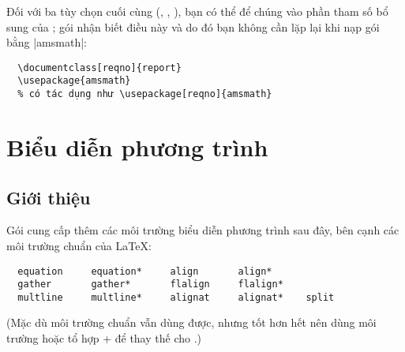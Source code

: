 \medskip
Đối với ba tùy chọn cuối cùng (, , ),
bạn có thể để chúng vào phần tham số bổ sung của ;
gói  nhận biết điều này và do đó bạn không cần lặp lại
khi nạp gói bằng |{amsmath}|:

\medskip
\begin{verbatim}
  \documentclass[reqno]{report}
  \usepackage{amsmath}
  % có tác dụng như \usepackage[reqno]{amsmath}
\end{verbatim}

\chapter{Biểu diễn phương trình}

\section{Giới thiệu}
Gói  cung cấp thêm các môi trường biểu diễn phương trình sau
đây, bên cạnh các môi trường chuẩn của \LaTeX{}:
\begin{verbatim}
  equation     equation*     align       align*
  gather       gather*       flalign     flalign*
  multline     multline*     alignat     alignat*    split
\end{verbatim}
(Mặc dù môi trường chuẩn  vẫn dùng được, nhưng tốt hơn hết
nên dùng môi trường  hoặc tổ hợp +
để thay thế cho .)

\medskip

